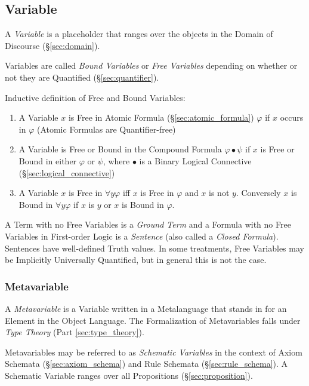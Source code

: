 \subsection{Variable}\label{sec:variable}

A \emph{Variable} is a placeholder that ranges over the objects in the
Domain of Discourse (\S\ref{sec:domain}).

Variables are called \emph{Bound Variables} or \emph{Free Variables}
depending on whether or not they are Quantified
(\S\ref{sec:quantifier}).

Inductive definition of Free and Bound Variables:
\begin{enumerate}
\item A Variable $x$ is Free in Atomic Formula
  (\S\ref{sec:atomic_formula}) $\varphi$ if $x$ occurs in $\varphi$
  (Atomic Formulas are Quantifier-free)
\item A Variable is Free or Bound in the Compound Formula $\varphi
  \bullet \psi$ if $x$ is Free or Bound in either $\varphi$ or $\psi$,
  where $\bullet$ is a Binary Logical Connective
  (\S\ref{sec:logical_connective})
\item A Variable $x$ is Free in $\forall y \varphi$ iff $x$ is Free in
  $\varphi$ and $x$ is not $y$. Conversely $x$ is Bound in $\forall y
  \varphi$ if $x$ is $y$ or $x$ is Bound in $\varphi$.
\end{enumerate}

A Term with no Free Variables is a \emph{Ground Term} and a Formula
with no Free Variables in First-order Logic is a \emph{Sentence} (also
called a \emph{Closed Formula}). Sentences have well-defined Truth
values. In some treatments, Free Variables may be Implicitly
Universally Quantified, but in general this is not the case.



\subsubsection{Metavariable}\label{sec:metavariable}

A \emph{Metavariable} is a Variable written in a Metalanguage that
stands in for an Element in the Object Language. The Formalization of
Metavariables falls under \emph{Type Theory} (Part
\ref{sec:type_theory}).

Metavariables may be referred to as \emph{Schematic Variables} in the
context of Axiom Schemata (\S\ref{sec:axiom_schema}) and Rule Schemata
(\S\ref{sec:rule_schema}). A Schematic Variable ranges over all
Propositions (\S\ref{sec:proposition}).



